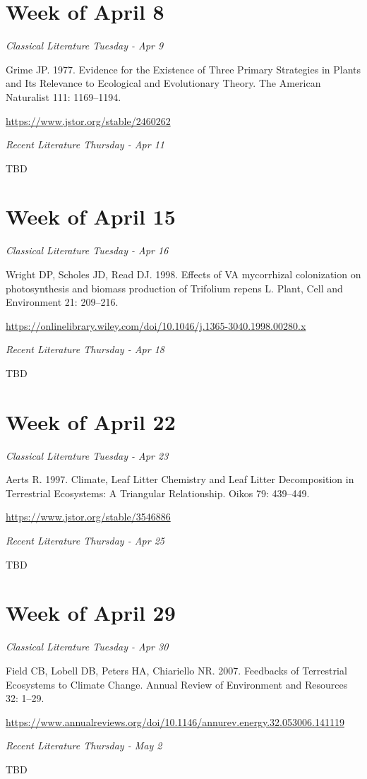 \documentclass[12pt, notitlepage]{article}   	%
\begin{document}
{\section*{Week of April 8}
\textit{Classical Literature Tuesday - Apr 9} \par
Grime JP. 1977. Evidence for the Existence of Three Primary Strategies in Plants and Its 
Relevance to Ecological and Evolutionary Theory. 
The American Naturalist 111: 1169–1194. \par
\url{https://www.jstor.org/stable/2460262}

\textit{Recent Literature Thursday - Apr 11} \par
TBD \par

\section*{Week of April 15}
\textit{Classical Literature Tuesday - Apr 16} \par
Wright DP, Scholes JD, Read DJ. 1998. Effects of VA mycorrhizal colonization on 
photosynthesis and biomass production of Trifolium repens L. 
Plant, Cell and Environment 21: 209–216. \par
\url{https://onlinelibrary.wiley.com/doi/10.1046/j.1365-3040.1998.00280.x}

\textit{Recent Literature Thursday - Apr 18} \par
TBD \par

\section*{Week of April 22}
\textit{Classical Literature Tuesday - Apr 23} \par
Aerts R. 1997. Climate, Leaf Litter Chemistry and Leaf Litter Decomposition in 
Terrestrial Ecosystems: A Triangular Relationship. Oikos 79: 439–449. \par
\url{https://www.jstor.org/stable/3546886}

\textit{Recent Literature Thursday - Apr 25} \par
TBD \par

\section*{Week of April 29}
\textit{Classical Literature Tuesday - Apr 30} \par
Field CB, Lobell DB, Peters HA, Chiariello NR. 2007. Feedbacks of Terrestrial Ecosystems 
to Climate Change. Annual Review of Environment and Resources 32: 1–29. \par
\url{https://www.annualreviews.org/doi/10.1146/annurev.energy.32.053006.141119}

\textit{Recent Literature Thursday - May 2} \par
TBD \par

} %
\end{document}
